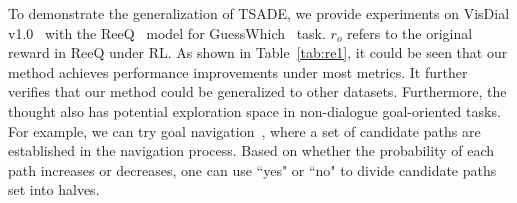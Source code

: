 To demonstrate the generalization of TSADE, we provide experiments on VisDial v1.0~\cite{2017Visual} with the ReeQ~\cite{Zheng_Xu_Meng_Wang_Wang_Zhou_2021} model for GuessWhich~\cite{das2017learning} task.
$r_o$ refers to the original reward in ReeQ under RL.
As shown in Table~\ref{tab:re1}, it could be seen that our method achieves  performance improvements under most metrics.
It further verifies that our method could be generalized to other datasets. 
Furthermore, the thought also has potential exploration space in non-dialogue goal-oriented tasks. 
For example, we can try goal navigation~\cite{chaplot2020object}, where a set of candidate paths are established in the navigation process.
Based on whether the probability of each path increases or decreases, one can use ``yes" or ``no" to divide candidate paths set into halves. 








